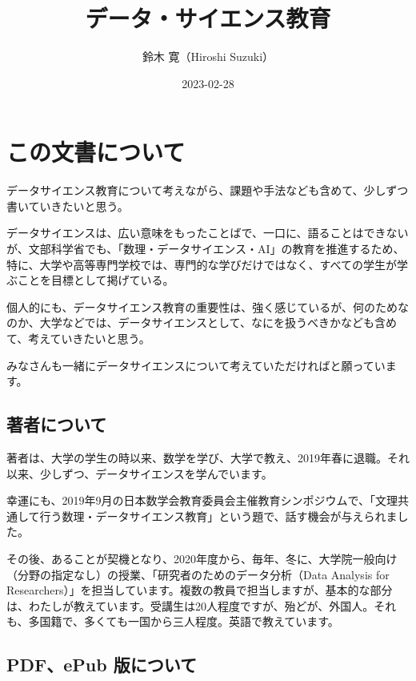 \documentclass[
]{book}
\title{データ・サイエンス教育}
\author{鈴木 寛（Hiroshi Suzuki）}
\date{2023-02-28}
\theoremstyle{definition}
\theoremstyle{definition}
\theoremstyle{definition}
\theoremstyle{definition}
\theoremstyle{remark}
\begin{document}
\maketitle

{
\setcounter{tocdepth}{1}
\tableofcontents
}
\hypertarget{ux3053ux306eux6587ux66f8ux306bux3064ux3044ux3066}{%
\chapter*{この文書について}\label{ux3053ux306eux6587ux66f8ux306bux3064ux3044ux3066}}

データサイエンス教育について考えながら、課題や手法なども含めて、少しずつ書いていきたいと思う。

データサイエンスは、広い意味をもったことばで、一口に、語ることはできないが、文部科学省でも、「数理・データサイエンス・AI」の教育を推進するため、特に、大学や高等専門学校では、専門的な学びだけではなく、すべての学生が学ぶことを目標として掲げている。

個人的にも、データサイエンス教育の重要性は、強く感じているが、何のためなのか、大学などでは、データサイエンスとして、なにを扱うべきかなども含めて、考えていきたいと思う。

みなさんも一緒にデータサイエンスについて考えていただければと願っています。

\hypertarget{ux8457ux8005ux306bux3064ux3044ux3066}{%
\section*{著者について}\label{ux8457ux8005ux306bux3064ux3044ux3066}}

著者は、大学の学生の時以来、数学を学び、大学で教え、2019年春に退職。それ以来、少しずつ、データサイエンスを学んでいます。

幸運にも、2019年9月の日本数学会教育委員会主催教育シンポジウムで、「文理共通して行う数理・データサイエンス教育」という題で、話す機会が与えられました。

その後、あることが契機となり、2020年度から、毎年、冬に、大学院一般向け（分野の指定なし）の授業、「研究者のためのデータ分析（Data Analysis for Researchers）」を担当しています。複数の教員で担当しますが、基本的な部分は、わたしが教えています。受講生は20人程度ですが、殆どが、外国人。それも、多国籍で、多くても一国から三人程度。英語で教えています。

\hypertarget{pdfepub-ux7248ux306bux3064ux3044ux3066}{%
\section*{PDF、ePub 版について}\label{pdfepub-ux7248ux306bux3064ux3044ux3066}}
\end{document}

